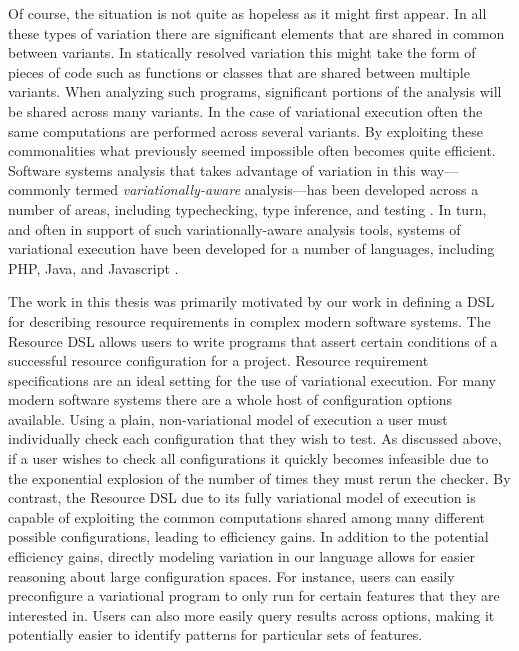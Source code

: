 \documentclass[12pt,oneside]{book}
\begin{document}
Of course, the situation is not quite as hopeless as it might first appear. In all these types of variation
there are significant elements that are shared in common between variants. In statically resolved variation this might take the form of pieces of code such as functions
or classes that are shared between multiple variants. When analyzing such programs, significant portions of the analysis will be shared across many variants. In the case of variational execution often the same computations are performed across several variants.
By exploiting these commonalities what previously seemed impossible often becomes quite efficient. Software systems analysis that takes advantage of variation
in this way---commonly termed \emph{variationally-aware} analysis---has been developed across a number of areas, including typechecking, type inference, and
testing \cite{kenner2010typechef,CEW14toplas,thum2014classification}. In turn, and often in support of such variationally-aware analysis tools, systems of variational execution have been developed for a number
of languages, including PHP, Java, and Javascript \cite{varex,varexj,faceted}.

The work in this thesis was primarily motivated by our work in defining a DSL for describing resource requirements in complex modern software
systems. The Resource DSL allows users to write programs that assert certain conditions of a successful resource configuration for a project.
Resource requirement specifications are an ideal setting for the use of variational execution. For many modern software systems there are a
whole host of configuration options available. Using a plain, non-variational model of execution a user must individually check each configuration that they wish to
test. As discussed above, if a user wishes to check all configurations it quickly becomes infeasible due to the exponential explosion of the number of times they must
rerun the checker. By contrast, the Resource DSL due to its fully variational model of execution is capable of exploiting the common computations shared among many different
possible configurations, leading to efficiency gains. In addition to the potential efficiency gains, directly modeling variation in our language allows for easier reasoning about
large configuration spaces. For instance, users can easily preconfigure a variational program to only run for certain features that they are interested in. Users can also more easily
query results across options, making it potentially easier to identify patterns for particular sets of features.
\end{document}

